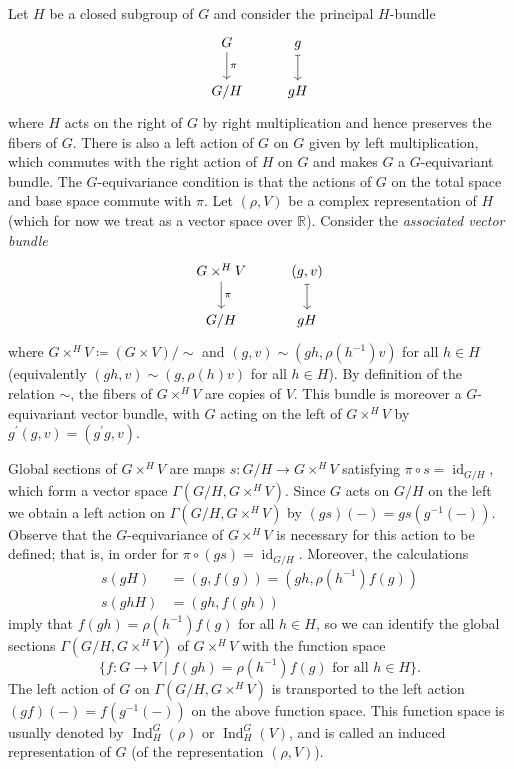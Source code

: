 \documentclass[11pt,leqno]{article}
\theoremstyle{plain}
\theoremstyle{definition}
\numberwithin{equation}{section}
\numberwithin{lem}{section}
\DeclareMathOperator{\Ind}{Ind}
\DeclareMathOperator{\id}{id}
\begin{document}
Let $H$ be a closed subgroup of $G$ and consider the principal $H$-bundle
\[\begin{tikzcd}[ampersand replacement=\&]
	G \& g \\
	{G/H} \& gH
	\arrow["\pi", from=1-1, to=2-1]
	\arrow[maps to, from=1-2, to=2-2]
\end{tikzcd}\]
where $H$ acts on the right of $G$ by right multiplication and hence preserves the fibers of $G$. There is also a left action of $G$ on $G$ given by left multiplication, which commutes with the right action of $H$ on $G$ and makes $G$ a $G$-equivariant bundle. The $G$-equivariance condition is that the actions of $G$ on the total space and base space commute with $\pi$. Let $(\rho,V)$ be a complex representation of $H$ (which for now we treat as a vector space over $\mathbb R$). Consider the \textit{associated vector bundle}
\[\begin{tikzcd}[ampersand replacement=\&]
	{G\times^H V} \& {(g,v)} \\
	{G/H} \& gH
	\arrow["\pi", from=1-1, to=2-1]
	\arrow[maps to, from=1-2, to=2-2]
\end{tikzcd}\]
where $G\times^H V \coloneqq (G\times V)/\sim$ and $(g,v) \sim (gh,\rho(h^{-1})v)$ for all $h\in H$ (equivalently $(gh,v) \sim (g,\rho(h)v)$ for all $h\in H$). By definition of the relation $\sim$, the fibers of $G\times^H V$ are copies of $V$. This bundle is moreover a $G$-equivariant vector bundle, with $G$ acting on the left of $G\times^H V$ by $g^\prime(g,v) = (g^\prime g,v)$.

Global sections of $G\times^H V$ are maps $s\colon G/H\to G\times^H V$ satisfying $\pi\circ s = \id_{G/H}$, which form a vector space $\Gamma(G/H, G\times^H V)$. Since $G$ acts on $G/H$ on the left we obtain a left action on $\Gamma(G/H, G\times^H V)$ by $(gs)(-) = gs(g^{-1}(-))$. Observe that the $G$-equivariance of $G\times^H V$ is necessary for this action to be defined; that is, in order for $\pi\circ (gs) = \id_{G/H}$. Moreover, the calculations 
\begin{align*}
  s(gH) &= (g,f(g)) = (gh,\rho(h^{-1})f(g))\\
  s(ghH)&= (gh,f(gh))
\end{align*}
imply that $f(gh) = \rho(h^{-1})f(g)$ for all $h\in H$, so we can identify the global sections $\Gamma(G/H, G\times^H V)$ of $G\times^H V$ with the function space 
\[\{f\colon G\to V\mid f(gh) = \rho(h^{-1})f(g)\text{ for all $h\in H$}\}.\]
The left action of $G$ on $\Gamma(G/H, G\times^H V)$ is transported to the left action $(gf)(-) = f(g^{-1}(-))$ on the above function space. This function space is usually denoted by $\Ind_H^G(\rho)$ or $\Ind_H^G(V)$, and is called an induced representation of $G$ (of the representation $(\rho, V)$).
\end{document}
